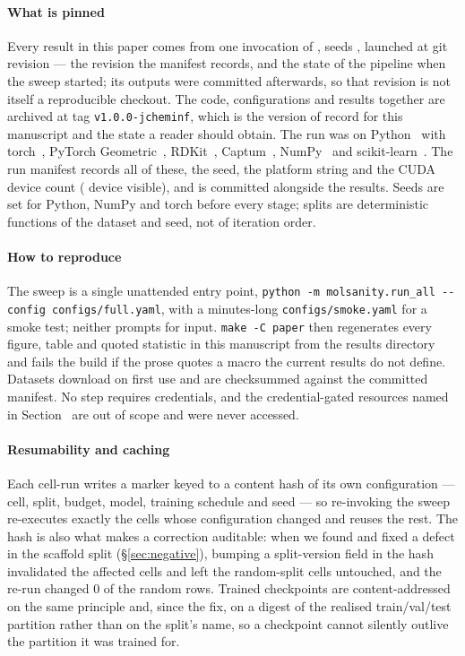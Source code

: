 \paragraph{What is pinned} Every result in this paper comes from one
invocation of \texttt{\runConfig{}}, seeds \runSeedList{}, launched at git
revision \texttt{\runGitRev{}} --- the revision the manifest records, and the
state of the pipeline when the sweep started; its outputs were committed
afterwards, so that revision is not itself a reproducible checkout. The code,
configurations and results together are archived at tag
\texttt{v1.0.0-jcheminf}, which is the version of record for this manuscript
and the state a reader should obtain. The run was on Python~\runPython{} with
torch~\runTorch{}, PyTorch Geometric~\runPyG{}, RDKit~\runRDKit{},
Captum~\runCaptum{}, NumPy~\runNumpy{} and scikit-learn~\runSklearn{}. The run
manifest records all of these, the seed, the platform string and the CUDA
device count (\runDevices{} device visible), and is committed alongside the
results. Seeds are set for Python, NumPy and torch before every stage; splits
are deterministic functions of the dataset and seed, not of iteration order.

\paragraph{How to reproduce} The sweep is a single unattended entry point,
\texttt{python -m molsanity.run\_\-all -{}-config configs/full.yaml}, with a
minutes-long \texttt{configs/smoke.yaml} for a smoke test; neither prompts for
input. \texttt{make -C paper} then regenerates every figure, table and quoted
statistic in this manuscript from the results directory and fails the build if
the prose quotes a macro the current results do not define. Datasets download
on first use and are checksummed against the committed manifest. No step
requires credentials, and the credential-gated resources named in
Section~ are out of scope and were never accessed.

\paragraph{Resumability and caching} Each cell-run writes a marker keyed to a
content hash of its own configuration --- cell, split, budget, model, training
schedule and seed --- so re-invoking the sweep re-executes exactly the cells
whose configuration changed and reuses the rest. The hash is also what makes a
correction auditable: when we found and fixed a defect in the scaffold split
(\S\ref{sec:negative}), bumping a split-version field in the hash invalidated
the affected cells and left the random-split cells untouched, and the re-run
changed $0$ of the random rows. Trained checkpoints are content-addressed on
the same principle and, since the fix, on a digest of the realised train/val/test
partition rather than on the split's name, so a checkpoint cannot silently
outlive the partition it was trained for.

